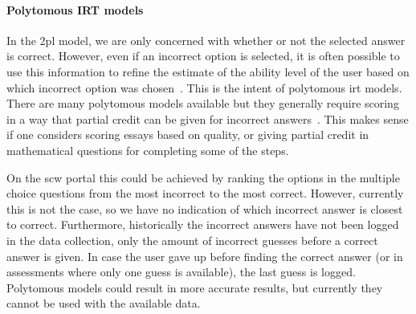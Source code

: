 \paragraph{Polytomous IRT models}
In the \gls{2pl} model, we are only concerned with whether or not the selected answer is correct.
However, even if an incorrect option is selected, it is often possible to use this information to refine the estimate of the ability level of the user based on which incorrect option was chosen~\cite{magis2017computerized}.
This is the intent of polytomous \gls{irt} models.
There are many polytomous models available but they generally require scoring in a way that partial credit can be given for incorrect answers~\cite{dodd1995computerized}.
This makes sense if one considers scoring essays based on quality, or giving partial credit in mathematical questions for completing some of the steps.

On the \gls{scw} portal this could be achieved by ranking the options in the multiple choice questions from the most incorrect to the most correct.
However, currently this is not the case, so we have no indication of which incorrect answer is closest to correct.
Furthermore, historically the incorrect answers have not been logged in the data collection, only the amount of incorrect guesses before a correct answer is given.
In case the user gave up before finding the correct answer (or in assessments where only one guess is available), the last guess is logged.
Polytomous models could result in more accurate results, but currently they cannot be used with the available data.

